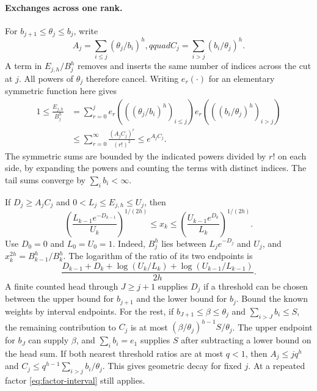 \paragraph{Exchanges across one rank.}
For \(b_{j+1}\le\theta_j\le b_j\), write
\[
 A_j=\sum_{i\le j}(\theta_j/b_i)^h,qquad
 C_j=\sum_{i>j}(b_i/\theta_j)^h .
\]
A term in \(E_{j,h}/B_j^h\) removes and inserts the same number of
indices across the cut at \(j\). All powers of \(\theta_j\)
therefore cancel. Writing \(e_r(\cdot)\) for an elementary symmetric
function here gives
\begin{equation}\label{eq:exchange-bound}
\begin{aligned}
 1\le \frac{E_{j,h}}{B_j^h}
 &=\sum_{r=0}^j e_r(((\theta_j/b_i)^h)_{i\le j})
                  e_r(((b_i/\theta_j)^h)_{i>j})\\
 &\le\sum_{r=0}^{\infty}\frac{(A_jC_j)^r}{(r!)^2}
 \le e^{A_jC_j}.
\end{aligned}
\end{equation}
The symmetric sums are bounded by the indicated powers divided by
\(r!\) on each side, by expanding the powers and counting the terms
with distinct indices. The tail sums converge by \(\sum_i b_i<\infty\).

If \(D_j\ge A_j C_j\) and \(0<L_j\le E_{j,h}\le U_j\), then
\begin{equation}\label{eq:exchange-interval}
 \left(\frac{L_{k-1}e^{-D_{k-1}}}{U_k}\right)^{1/(2h)}
 \le x_k\le
 \left(\frac{U_{k-1}e^{D_k}}{L_k}\right)^{1/(2h)} .
\end{equation}
Use \(D_0=0\) and \(L_0=U_0=1\).
Indeed, \(B_j^h\) lies between \(L_j e^{-D_j}\) and \(U_j\), and
\(x_k^{2h}=B_{k-1}^h/B_k^h\). The logarithm of the ratio of its two
endpoints is
\[
 \frac{D_{k-1}+D_k+\log(U_k/L_k)+\log(U_{k-1}/L_{k-1})}{2h}.
\]
A finite counted head through \(J\ge j+1\) supplies \(D_j\) if a
threshold can be chosen between the upper bound for \(b_{j+1}\) and
the lower bound for \(b_j\). Bound the known weights by interval
endpoints. For the rest, if \(b_{J+1}\le\beta\le\theta_j\) and
\(\sum_{i>J}b_i\le S\), the remaining contribution to \(C_j\)
is at most \((\beta/\theta_j)^{h-1}S/\theta_j\). The upper
endpoint for \(b_J\) can supply \(\beta\), and
\(\sum_i b_i=e_1\) supplies \(S\) after subtracting a lower
bound on the head sum. If both nearest threshold ratios are at
most \(q<1\), then \(A_j\le jq^h\) and
\(C_j\le q^{h-1}\sum_{i>j}b_i/\theta_j\). This gives geometric
decay for fixed \(j\). At a repeated factor \eqref{eq:factor-interval}
still applies.

